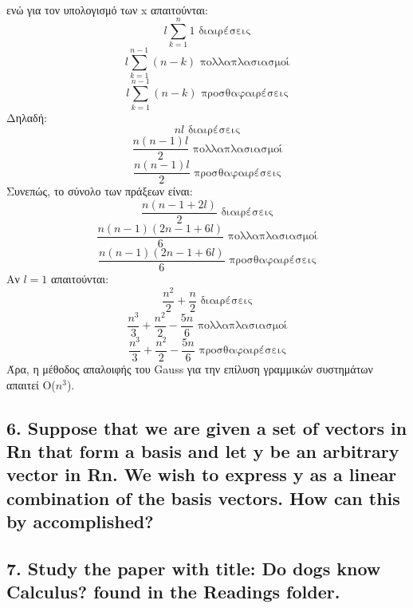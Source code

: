 \documentclass[12pt]{article}
\begin{document}
\\ ενώ για τον υπολογισμό των x απαιτούνται:
$$ l\sum_{k=1}^{n}1 \mbox{ διαιρέσεις}$$
$$ l\sum_{k=1}^{n-1}{(n-k)} \mbox{ πολλαπλασιασμοί}$$
$$ l\sum_{k=1}^{n-1}{(n-k)} \mbox{ προσθαφαιρέσεις}$$
Δηλαδή:
$$ nl \mbox{ διαιρέσεις} $$
$$ \frac{n(n-1)l}{2} \mbox{ πολλαπλασιασμοί}$$
$$ \frac{n(n-1)l}{2} \mbox{ προσθαφαιρέσεις}$$
Συνεπώς, το σύνολο των πράξεων είναι:
$$ \frac{n(n-1+2l)}{2} \mbox{ διαιρέσεις} $$
$$ \frac{n(n-1)(2n-1+6l)}{6} \mbox{ πολλαπλασιασμοί}$$
$$ \frac{n(n-1)(2n-1+6l)}{6} \mbox{ προσθαφαιρέσεις}$$
Αν $l=1$ απαιτούνται:
$$ \frac{n^2}{2} + \frac{n}{2} \mbox{ διαιρέσεις}$$
$$ \frac{n^3}{3} + \frac{n^2}{2} - \frac{5n}{6} \mbox{ πολλαπλασιασμοί}$$
$$ \frac{n^3}{3} + \frac{n^2}{2} - \frac{5n}{6} \mbox{ προσθαφαιρέσεις}$$
Άρα, η μέθοδος απαλοιφής του Gauss για την επίλυση γραμμικών συστημάτων απαιτεί Ο($n^3$).
\vspace{2in}


\pagebreak

\subsection*{6. Suppose that we are given a set of vectors in Rn that form a basis and let y be an
arbitrary vector in Rn. We wish to express y as a linear combination of the basis vectors. How
can this by accomplished?}

\vspace{2in}


\pagebreak

\subsection*{7. Study the paper with title: Do dogs know Calculus? found in the Readings folder.}

\vspace{2in}
\end{document}
